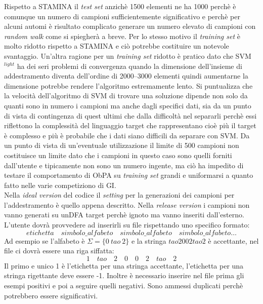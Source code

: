 Rispetto a STAMINA il \textit{test set} anzichè 1500 elementi ne ha 1000 perchè è comunque un numero di campioni sufficientemente significativo e perchè per alcuni automi è risultato  complicato generare un numero elevato di campioni con \textit{random walk} come si spiegherà a breve. Per lo stesso motivo il \textit{training set} è molto ridotto rispetto a STAMINA e ciò potrebbe costituire un notevole svantaggio. Un'altra ragione per un \textit{training set} ridotto è pratico dato che SVM$^{light}$ ha dei seri problemi di convergenza quando la dimensione dell'insieme di addestramento diventa dell'ordine di 2000--3000 elementi quindi aumentarne la dimensione potrebbe rendere l'algoritmo estremamente lento. Si puntualizza che la velocità dell'algoritmo di \ac{SVM} di trovare una soluzione dipende non solo da quanti sono in numero i campioni ma anche dagli specifici dati, sia da un punto di vista di contingenza di quest ultimi che dalla difficoltà nel separarli perchè essi riflettono la complessità del linguaggio target che rappresentano cioè più il target è complesso e più è probabile che i dati siano difficili da separare con \ac{SVM}. Da un punto di vista di un'eventuale utilizzazione il limite di 500 campioni non costituisce un limite dato che i campioni in questo caso sono quelli forniti dall'utente e tipicamente non sono un numero ingente, ma ciò ha impedito di testare il comportamento di \ac{ObPA} su \textit{training set} grandi e uniformarsi a quanto fatto nelle varie competiziono di \ac{GI}.  \\ 
 Nella \textit{ideal version} del codice il \textit{setting} per la generazioni dei campioni per l'addestramento è quello appena descritto.
Nella \textit{release version} i campioni non vanno generati su un\ac{DFA} target perchè ignoto ma vanno inseriti dall'esterno. L'utente dovrà provvedere ad inserirli su file rispettando uno specifico formato:  
\begin{equation*}
etichetta \quad simbolo\_alfabeto \quad simbolo\_alfabeto \quad simbolo\_alfabeto \dots
\end{equation*}
Ad esempio se l'alfabeto è $\Sigma = \{0 \: tao \: 2\}$ e la stringa $tao2002tao2$ è accettante, nel file ci dovrà essere una riga siffatta:
\begin{equation*}
1 \quad tao \quad 2 \quad 0 \quad 0 \quad 2 \quad tao \quad 2
\end{equation*}
Il primo e unico 1 è l'etichetta per una stringa accettante, l'etichetta per una stringa rigettante deve essere -1. Inoltre è necessario inserire nel file prima gli esempi positivi e poi a seguire quelli negativi. Sono ammessi duplicati perchè potrebbero essere significativi.\\

